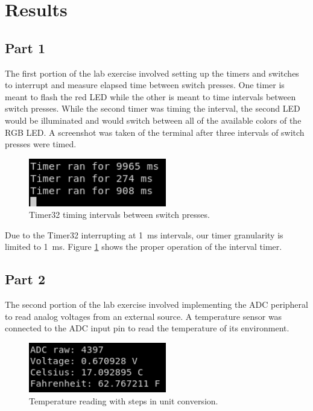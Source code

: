 \documentclass[CMPE]{../KGCOEReport}
\begin{document}
    \section*{Results}

	\subsection*{Part 1}
	The first portion of the lab exercise involved setting up the timers and switches
	to interrupt and measure elapsed time between switch presses. One timer is meant to
	flash the red LED while the other is meant to time intervals between switch presses.
	While the second timer was timing the interval, the second LED would be illuminated
	and would switch between all of the available colors of the RGB LED.
	A screenshot was taken of the terminal after three intervals of switch presses were
	timed.

	\begin{figure}[h!]
        \centering
        \includegraphics[width=6cm]{tim}
        \caption{Timer32 timing intervals between switch presses.}
        \label{fig:tim}
	\end{figure}

	Due to the Timer32 interrupting at \SI{1}{\milli\s} intervals, our timer granularity
	is limited to \SI{1}{\milli\s}. Figure \ref{fig:tim} shows the proper operation of the
	interval timer.

	\subsection*{Part 2}

	The second portion of the lab exercise involved implementing the ADC peripheral
	to read analog voltages from an external source. A temperature sensor was connected
	to the ADC input pin to read the temperature of its environment.

	\begin{figure}[h!]
        \centering
        \includegraphics[width=6cm]{adc}
        \caption{Temperature reading with steps in unit conversion.}
        \label{fig:adc}
	\end{figure}
\end{document}
